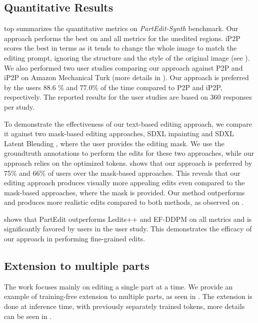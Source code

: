 
\subsection{Quantitative Results}



 top summarizes the quantitative metrics on \emph{PartEdit-Synth} benchmark.
Our approach performs the best on  and all metrics for the unedited regions.
iP2P scores the best in terms  as it tends to change the whole image to match the editing prompt, ignoring the structure and the style of the original image (see ).
We also performed two user studies comparing our approach against P2P and iP2P on Amazon Mechanical Turk (more details in ).
Our approach is preferred by the users 88.6 \% and 77.0\% of the time compared to P2P and iP2P, respectively.
The reported results for the user studies are based on 360 responses per study.

To demonstrate the effectiveness of our text-based editing approach, we compare it against two mask-based editing approaches, SDXL inpainting and SDXL Latent Blending \citep{avrahami2023blendedlatent}, where the user provides the editing mask.
We use the groundtruth annotations to perform the edits for these two approaches, while our approach relies on the optimized tokens.
 shows that our approach is preferred by 75\% and 66\% of users over the mask-based approaches.
This reveals that our editing approach produces visually more appealing edits even compared to the mask-based approaches, where the mask is provided. Our method outperforms and produces more realistic edits compared to both methods, as observed on .

 shows that PartEdit outperforms Ledits++ and EF-DDPM on all metrics and is significantly favored by users in the user study.
This demonstrates the efficacy of our approach in performing fine-grained edits.







\subsection{Extension to multiple parts}
The work focuses mainly on editing a single part at a time. We provide an example of training-free extension to multiple parts, as seen in . The extension is done at inference time, with previously separately trained tokens, more details can be seen in .

